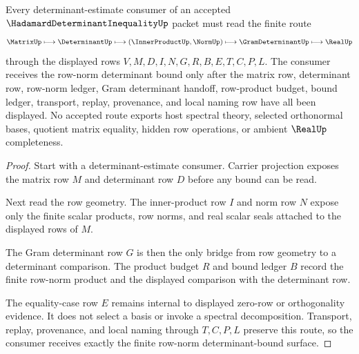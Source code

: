 \begin{theorem}
\label{thm:hadamard-determinant-inequality-row-norm-bound-route}
Every determinant-estimate consumer of an accepted
$\HadamardDeterminantInequalityUp$ packet must read the finite route
$$
\MatrixUp \longmapsto \DeterminantUp \longmapsto
(\InnerProductUp,\NormUp) \longmapsto \GramDeterminantUp \longmapsto \RealUp
$$
through the displayed rows $V,M,D,I,N,G,R,B,E,T,C,P,L$. The consumer receives
the row-norm determinant bound only after the matrix row, determinant row,
row-norm ledger, Gram determinant handoff, row-product budget, bound ledger,
transport, replay, provenance, and local naming row have all been displayed.
No accepted route exports host spectral theory, selected orthonormal bases,
quotient matrix equality, hidden row operations, or ambient $\RealUp$
completeness.
\end{theorem}
\begin{proof}
Start with a determinant-estimate consumer. Carrier projection exposes the
matrix row $M$ and determinant row $D$ before any bound can be read.

Next read the row geometry. The inner-product row $I$ and norm row $N$ expose
only the finite scalar products, row norms, and real scalar seals attached to
the displayed rows of $M$.

The Gram determinant row $G$ is then the only bridge from row geometry to a
determinant comparison. The product budget $R$ and bound ledger $B$ record the
finite row-norm product and the displayed comparison with the determinant row.

The equality-case row $E$ remains internal to displayed zero-row or
orthogonality evidence. It does not select a basis or invoke a spectral
decomposition. Transport, replay, provenance, and local naming through
$T,C,P,L$ preserve this route, so the consumer receives exactly the finite
row-norm determinant-bound surface.
\end{proof}


